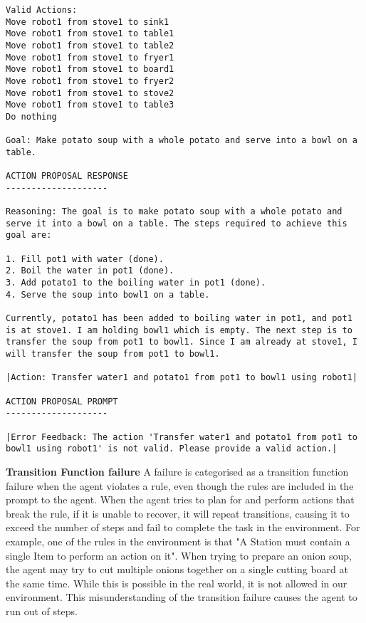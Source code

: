 \begin{lstlisting}
Valid Actions:
Move robot1 from stove1 to sink1
Move robot1 from stove1 to table1
Move robot1 from stove1 to table2
Move robot1 from stove1 to fryer1
Move robot1 from stove1 to board1
Move robot1 from stove1 to fryer2
Move robot1 from stove1 to stove2
Move robot1 from stove1 to table3
Do nothing

Goal: Make potato soup with a whole potato and serve into a bowl on a table.

ACTION PROPOSAL RESPONSE
--------------------

Reasoning: The goal is to make potato soup with a whole potato and serve it into a bowl on a table. The steps required to achieve this goal are:

1. Fill pot1 with water (done).
2. Boil the water in pot1 (done).
3. Add potato1 to the boiling water in pot1 (done).
4. Serve the soup into bowl1 on a table.

Currently, potato1 has been added to boiling water in pot1, and pot1 is at stove1. I am holding bowl1 which is empty. The next step is to transfer the soup from pot1 to bowl1. Since I am already at stove1, I will transfer the soup from pot1 to bowl1.

|Action: Transfer water1 and potato1 from pot1 to bowl1 using robot1|

ACTION PROPOSAL PROMPT
--------------------

|Error Feedback: The action 'Transfer water1 and potato1 from pot1 to bowl1 using robot1' is not valid. Please provide a valid action.|

\end{lstlisting}

\textbf{Transition Function failure}
A failure is categorised as a transition function failure when the agent violates a rule, even though the rules are included in the prompt to the agent. When the agent tries to plan for and perform actions that break the rule, if it is unable to recover, it will repeat transitions, causing it to exceed the number of steps and fail to complete the task in the environment. For example, one of the rules in the environment is that "A Station must contain a single Item to perform an action on it". When trying to prepare an onion soup, the agent may try to cut multiple onions together on a single cutting board at the same time. While this is possible in the real world, it is not allowed in our environment. This misunderstanding of the transition failure causes the agent to run out of steps. 


